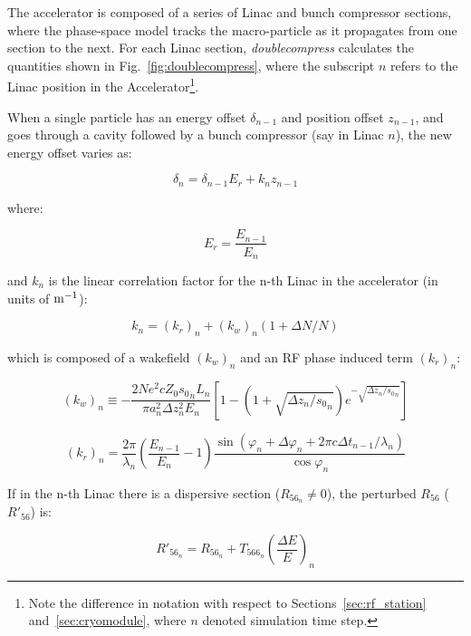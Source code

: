 \documentclass[a4paper,12pt]{article}
\begin{document}
The accelerator is composed of a series of Linac and bunch compressor sections, where the phase-space model tracks the macro-particle as it propagates from one section to the next. For each Linac section, \emph{doublecompress} calculates the quantities shown in Fig.~\ref{fig:doublecompress}, where the subscript $n$ refers to the Linac position in the Accelerator\footnote{Note the difference in notation with respect to Sections~\ref{sec:rf_station} and~\ref{sec:cryomodule}, where $n$ denoted simulation time step.}.

When a single particle has an energy offset $\delta_{n-1}$ and position offset $z_{n-1}$, and goes through a cavity followed by a bunch compressor (say in Linac $n$), the new energy offset varies as:

\begin{equation}
  \delta_{n}=\delta_{n-1} E_r +k_n z_{n-1}
\end{equation}

\noindent where:

\begin{equation}
  E_r = \frac{E_{n-1}}{E_n}
\end{equation}

\noindent and $k_n$ is the linear correlation factor for the n-th Linac in the accelerator (in units of $\rm m^{-1}$):

\begin{equation}
  k_n = (k_r)_n + (k_w)_n\left(1+\Delta N/N\right)
\end{equation}

\noindent which is composed of a wakefield $(k_w)_n$ and an RF phase induced term $(k_r)_n$:

\begin{equation}
  (k_w)_n \equiv -\frac{2Ne^2cZ_0{s_0}_n L_n}{\pi a^2_n \Delta z^2_n E_n}
    \left[ 1-(1+\sqrt{\Delta z_n/{s_0}_n})e^{-\sqrt{\Delta z_n/{s_0}_n}} \right]
\end{equation}

\begin{equation}
  (k_r)_n = \frac{2\pi}{\lambda_n}\left(\frac{E_{n-1}}{E_n}-1\right)\frac{\sin(\varphi_n+\Delta \varphi_n+2\pi c \Delta t_{n-1}/\lambda_n)}{\cos \varphi_n}
\end{equation}

If in the n-th Linac there is a dispersive section ($R_{56_n}\neq 0$), the perturbed $R_{56}$ ($R'_{56}$) is:

\begin{equation}
  R'_{56_n} = R_{56_n} + T_{566_n}\left( \frac{\Delta E}{E}\right)_n
\end{equation}
\end{document}
